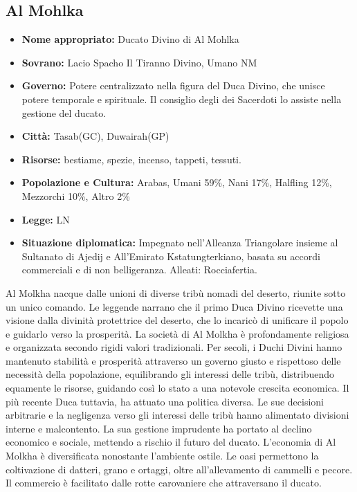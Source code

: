 \documentclass[10pt, a4paper]{report}
\begin{document}
\begin{multicols}{2}
\subsection*{Al Mohlka}
\begin{itemize}
	\item \textbf{Nome appropriato:} Ducato Divino di Al Mohlka
	\item \textbf{Sovrano: }Lacio Spacho Il Tiranno Divino, Umano NM
	\item \textbf{Governo: }Potere centralizzato nella figura del Duca Divino, che unisce potere temporale e spirituale. Il consiglio degli dei Sacerdoti lo assiste nella gestione del ducato.
	\item \textbf{Città: }Tasab(GC), Duwairah(GP)
	\item \textbf{Risorse:}  bestiame, spezie, incenso, tappeti, tessuti.
	\item \textbf{Popolazione e Cultura:} Arabas, Umani 59\%, Nani 17\%, Halfling 12\%, Mezzorchi 10\%, Altro 2\% 
	\item \textbf{Legge:} LN
	\item \textbf{Situazione diplomatica: }Impegnato nell'Alleanza Triangolare insieme al Sultanato di Ajedij e All'Emirato Kstatungterkiano, basata su accordi commerciali e di non belligeranza. Alleati: Rocciafertia.
\end{itemize}
Al Molkha nacque dalle unioni di diverse tribù nomadi del deserto, riunite sotto un unico comando. Le leggende narrano che il primo Duca Divino ricevette una visione dalla divinità protettrice del deserto, che lo incaricò di unificare il popolo e guidarlo verso la prosperità.  La società di Al Molkha è profondamente religiosa e organizzata secondo rigidi valori tradizionali. Per secoli, i Duchi Divini hanno mantenuto stabilità e prosperità attraverso un governo giusto e rispettoso delle necessità della popolazione, equilibrando gli interessi delle tribù, distribuendo equamente le risorse, guidando così lo stato a una notevole crescita economica.
Il più recente Duca tuttavia, ha attuato una politica diversa. Le sue decisioni arbitrarie e la negligenza verso gli interessi delle tribù hanno alimentato divisioni interne e malcontento. La sua gestione imprudente ha portato al declino economico e sociale, mettendo a rischio il futuro del ducato. 
L'economia di Al Molkha è diversificata nonostante l'ambiente ostile. Le oasi permettono la coltivazione di datteri, grano e ortaggi, oltre all'allevamento di cammelli e pecore. Il commercio è facilitato dalle rotte carovaniere che attraversano il ducato.


\end{multicols}
\end{document}
